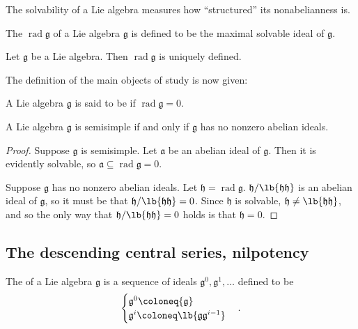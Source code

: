 \documentclass{article}
\DeclarePairedDelimiter\lb\lbrack\rbrack
\DeclareMathOperator{\rad}{rad}
\newcommand*\frka{{\ensuremath{\mathfrak{a}}}}
\newcommand*\frkg{{\ensuremath{\mathfrak{g}}}}
\newcommand*\frkh{{\ensuremath{\mathfrak{h}}}}
\begin{document}
The solvability of a Lie algebra measures how ``structured'' its nonabelianness is.

\begin{definition}
    The  $\rad \frkg$ of a Lie algebra $\frkg$ is defined to be the maximal solvable ideal of $\frkg$.
\end{definition}

\begin{proposition}
    Let $\frkg$ be a Lie algebra.
    Then $\rad \frkg$ is uniquely defined.
\end{proposition}

The definition of the main objects of study is now given: 

\begin{definition}
    A Lie algebra $\frkg$ is said to be  if $\rad \frkg = 0$.
\end{definition}

\begin{proposition}
    \label{prop:SemisimpleIffNoAbelianIdeals}
    A Lie algebra $\frkg$ is semisimple if and only if $\frkg$ has no nonzero abelian ideals.
\end{proposition}

\begin{proof}
    Suppose $\frkg$ is semisimple.
    Let $\frka$ be an abelian ideal of $\frkg$.
    Then it is evidently solvable, so $\frka \subseteq \rad \frkg = 0$.

    Suppose $\frkg$ has no nonzero abelian ideals.
    Let $\frkh = \rad \frkg$. 
    $\frkh/\lb{\frkh\frkh}$ is an abelian ideal of $\frkg$, so it must be that $\frkh/\lb{\frkh\frkh} = 0$.
    Since $\frkh$ is solvable, $\frkh \neq \lb{\frkh\frkh}$, and so the only way that $\frkh/\lb{\frkh\frkh} = 0$ holds is that $\frkh = 0$.
\end{proof}

\subsection{The descending central series, nilpotency}

\begin{definition}
    The  of a Lie algebra $\frkg$ is a sequence of ideals $\frkg^0, \frkg^1, \ldots$ defined to be
    \[
        \begin{cases}
            \frkg^0 \coloneq \frkg \\
            \frkg^i \coloneq \lb{\frkg\frkg^{i-1}} \\
        \end{cases}.
    \]
\end{definition}
\end{document}

